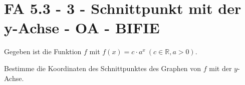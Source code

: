 \section{FA 5.3 - 3 - Schnittpunkt mit der y-Achse - OA - BIFIE}

\begin{beispiel}[FA 5.3]{1} %
Gegeben ist die Funktion $f$ mit $f(x)=c\cdot a^x ~ (c\in \mathbb{R}, a>0)$.
\leer

Bestimme die Koordinaten des Schnittpunktes des Graphen von $f$ mit der $y$-Achse.

\end{beispiel}